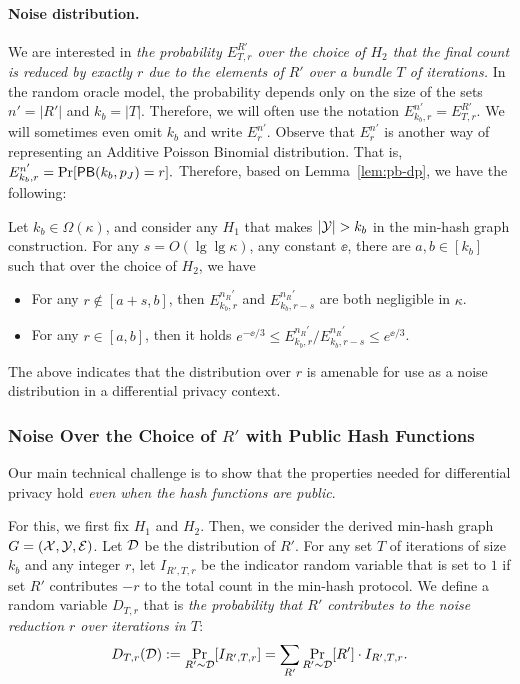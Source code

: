 \paragraph{Noise distribution.}
We are interested in {\em the probability $E^{R'}_{T,r}$ over the
choice of $H_2$ that the final count is reduced by exactly
$r$ due to the elements of $R'$ over a bundle $T$ of iterations.} 
In the random oracle model, the probability depends only on the size of the sets
$n' = |R'|$ and $k_b = |T|$. Therefore, we will often use
the notation $E^{n'}_{k_b,r} = E^{R'}_{T,r}$. We will sometimes even omit
$k_b$ and write $E^{n'}_r$. 
%
Observe that $E^{n'}_{r}$ is another way of representing an
Additive Poisson Binomial distribution. That is, 
%
$E^{n'}_{k_b,r} = \Pr[ \mathsf{PB}(k_b, p_J) = r ].$
%
Therefore, based on Lemma~\ref{lem:pb-dp}, we have the following: 
%
\begin{corollary} \label{lem:concrete_expected_probs}
Let $k_b \in \Omega(\kappa)$, and consider any $H_1$ that makes $|\mathcal{Y}| >
k_b$ in the min-hash graph construction. For any $s = O(\lg\lg\kappa)$, any
constant $\ee$, there are $a, b \in [k_b]$ such that over the choice of $H_2$,
we have \begin{itemize}
\item For any $r \not \in[a + s, b]$, then $E^{n_R'}_{k_b, r}$
  and $E^{n_R'}_{k_b, r-s}$ are both negligible in $\kappa$.
\item For any $r \in [a, b]$, then it holds  
$e^{-\ee/3} \leq E^{n_R'}_{k_b, r}/E^{n_R'}_{k_b, r-s}
\leq e^{\ee/3}$.
\end{itemize}
\end{corollary}


The above indicates that the distribution over $r$ is amenable for use as a
noise distribution in a differential privacy context. 


\subsubsection{Noise Over the Choice of $R'$ with Public Hash Functions} 
Our main technical challenge is to show that the properties needed for
differential privacy hold {\em even when the hash functions are public}. 

For this, we first fix $H_1$ and $H_2$. Then, we consider the derived min-hash graph $G =
(\mathcal{X}, \mathcal{Y}, \mathcal{E})$. 
Let  ${\cal D}$ be the distribution of $R'$.
For any set $T$ of iterations of size $k_b$ and any
integer $r$, let $I_{R', T, r}$ be the indicator random variable that is set to
$1$ if set $R'$ contributes $-r$ to the total count in the min-hash protocol. 
%
We define a random variable $D_{T,r}$ that is \emph{the probability that $R'$ contributes to the noise reduction $r$ over iterations in
$T$}: %
\[ D_{T,r}({\cal D}) := \Pr_{R' \sim {\cal D}}[ I_{R', T, r} ] = 
\sum_{R'} \Pr_{R' \sim {\cal D}}[R'] \cdot I_{R', T, r}. \]


